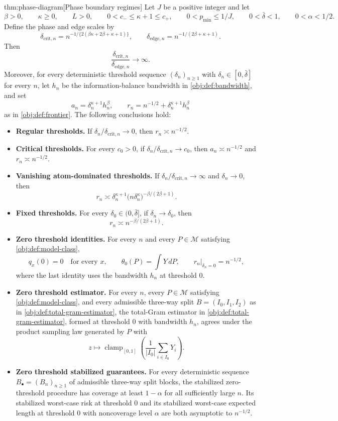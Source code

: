 \begin{theoremv}{thm:phase-diagram}[Phase boundary regimes]
Let \(J\) be a positive integer and let
\[
\beta>0,\qquad
\kappa\geq 0,\qquad
L>0,\qquad
0<c_-\leq \kappa+1\leq c_+,\qquad
0<p_{\min}\leq 1/J,\qquad
0<\bar\delta<1,\qquad
0<\alpha<1/2 .
\]
Define the phase and edge scales by
\[
\delta_{\mathrm{crit},n}
=
n^{-1/\{2(\beta\kappa+2\beta+\kappa+1)\}},
\qquad
\delta_{\mathrm{edge},n}
=
n^{-1/(2\beta+\kappa+1)} .
\]
Then
\[
\frac{\delta_{\mathrm{crit},n}}{\delta_{\mathrm{edge},n}}\to\infty .
\]
Moreover, for every deterministic threshold sequence \((\delta_n)_{n\geq 1}\) with \(\delta_n\in[0,\bar\delta]\) for every \(n\), let \(h_n\) be the information-balance bandwidth in \cref{obj:def:bandwidth}, and set
\[
a_n=\delta_n^{\kappa+1}h_n^\beta,
\qquad
r_n=n^{-1/2}+\delta_n^{\kappa+1}h_n^\beta
\]
as in \cref{obj:def:frontier}. The following conclusions hold:
\begin{itemize}
\item \textbf{Regular thresholds.} If \(\delta_n/\delta_{\mathrm{crit},n}\to 0\), then \(r_n\asymp n^{-1/2}\).
\item \textbf{Critical thresholds.} For every \(c_0>0\), if \(\delta_n/\delta_{\mathrm{crit},n}\to c_0\), then \(a_n\asymp n^{-1/2}\) and \(r_n\asymp n^{-1/2}\).
\item \textbf{Vanishing atom-dominated thresholds.} If \(\delta_n/\delta_{\mathrm{crit},n}\to\infty\) and \(\delta_n\to0\), then
\[
r_n\asymp
\delta_n^{\kappa+1}\bigl(n\delta_n^\kappa\bigr)^{-\beta/(2\beta+1)} .
\]
\item \textbf{Fixed thresholds.} For every \(\delta_0\in(0,\bar\delta]\), if \(\delta_n\to\delta_0\), then
\[
r_n\asymp n^{-\beta/(2\beta+1)} .
\]
\item \textbf{Zero threshold identities.} For every \(n\) and every \(P\in\mathcal M\) satisfying \cref{obj:def:model-class},
\[
q_x(0)=0\quad\text{for every }x,\qquad
\theta_0(P)=\int Y\,dP,\qquad
r_n\big|_{\delta_n=0}=n^{-1/2},
\]
where the last identity uses the bandwidth \(h_n\) at threshold \(0\).
\item \textbf{Zero threshold estimator.} For every \(n\), every \(P\in\mathcal M\) satisfying \cref{obj:def:model-class}, and every admissible three-way split \(B=(I_0,I_1,I_2)\) as in \cref{obj:def:total-gram-estimator}, the total-Gram estimator in \cref{obj:def:total-gram-estimator}, formed at threshold \(0\) with bandwidth \(h_n\), agrees under the product sampling law generated by \(P\) with
\[
z\mapsto
\operatorname{clamp}_{[0,1]}\!\left(\frac{1}{|I_0|}\sum_{i\in I_0}Y_i\right).
\]
\item \textbf{Zero threshold stabilized guarantees.} For every deterministic sequence \(B_\bullet=(B_n)_{n\geq1}\) of admissible three-way split blocks, the stabilized zero-threshold procedure has coverage at least \(1-\alpha\) for all sufficiently large \(n\). Its stabilized worst-case risk at threshold \(0\) and its stabilized worst-case expected length at threshold \(0\) with noncoverage level \(\alpha\) are both asymptotic to \(n^{-1/2}\).
\end{itemize}
\end{theoremv}


